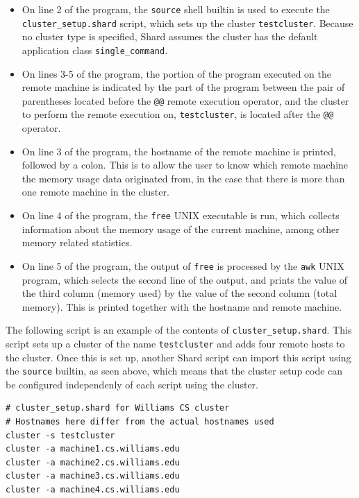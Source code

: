 \documentclass[twoside]{report}
\begin{document}
\begin{itemize}
  \item On line 2 of the program, the \texttt{source} shell builtin is used to execute the \texttt{cluster\_setup.shard} script, which sets up the cluster \texttt{testcluster}.
        Because no cluster type is specified, Shard assumes the cluster has the default application class \texttt{single\_command}.
  \item On lines 3-5 of the program, the portion of the program executed on the remote machine is indicated by the part of the program between the pair of parentheses located before the \texttt{@@} remote execution operator, and the cluster to perform the remote execution on, \texttt{testcluster}, is located after the \texttt{@@} operator.
  \item On line 3 of the program, the hostname of the remote machine is printed, followed by a colon. This is to allow the user to know which remote machine the memory usage data originated from, in the case that there is more than one remote machine in the cluster.
  \item On line 4 of the program, the \texttt{free} UNIX executable is run, which collects information about the memory usage of the current machine, among other memory related statistics.
  \item On line 5 of the program, the output of \texttt{free} is processed by the \texttt{awk} UNIX program, which selects the second line of the output, and prints the value of the third column (memory used) by the value of the second column (total memory). This is printed together with the hostname and remote machine.
\end{itemize}

The following script is an example of the contents of \texttt{cluster\_setup.shard}.
This script sets up a cluster of the name \texttt{testcluster} and adds four remote hosts to the cluster.
Once this is set up, another Shard script can import this script using the \texttt{source} builtin, as seen above, which means that the cluster setup code can be configured independenly of each script using the cluster.

\begin{minipage}[c]{\textwidth-15pt}
  \begin{lstlisting}[language=Shard]
# cluster_setup.shard for Williams CS cluster 
# Hostnames here differ from the actual hostnames used
cluster -s testcluster
cluster -a machine1.cs.williams.edu
cluster -a machine2.cs.williams.edu
cluster -a machine3.cs.williams.edu
cluster -a machine4.cs.williams.edu
\end{lstlisting}
  \smallskip
\end{minipage}
\end{document}

